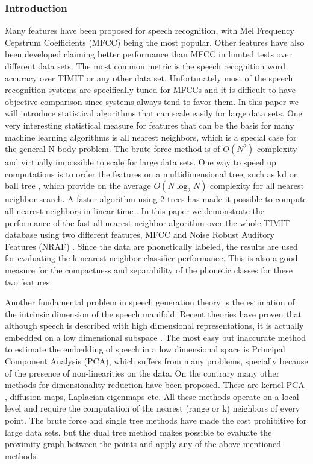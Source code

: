 \documentclass[12pt,letterpaper,doublespaced,ETD,dvips,proposal]{gtthesis}
\begin{document}
\begin{Body}
\subsubsection{Introduction}
Many features have been proposed for speech recognition, with Mel
Frequency Cepstrum Coefficients (MFCC) \cite{quatieri2002dts} being
the most popular. Other features have also been developed claiming
better performance than MFCC in limited tests over different data
sets. The most common metric is the speech recognition word accuracy
over TIMIT or any other data set. Unfortunately most of the speech
recognition systems are specifically tuned for MFCCs and it is
difficult to have objective comparison since systems always tend to
favor them. In this paper we will introduce statistical algorithms
that can scale easily for large data sets. One very interesting
statistical measure for features that can be the basis for many
machine learning algorithms is all nearest neighbors, which is a
special case for the general N-body problem. The brute force method
is of $O(N^2)$  complexity and virtually impossible to scale for
large data sets. One way to speed up computations is to order the
features on a multidimensional tree, such as kd or ball tree
\cite{bentley1975bst}, \cite{moore2000ahu} which provide on the
average $O(N\log_2N)$ complexity for all nearest neighbor search. A
faster algorithm using 2 trees has made it possible to compute all
nearest neighbors in linear time \cite{gray2000nbp}.  In this paper
we demonstrate the performance of the fast all nearest neighbor
algorithm over the whole TIMIT database using two different
features, MFCC and Noise Robust Auditory Features (NRAF)
\cite{ravindran:inr}. Since the data are phonetically labeled, the
results are used for evaluating the k-nearest neighbor classifier
performance. This is also a good measure for the compactness and
separability of the phonetic classes for these two features.

Another fundamental problem in speech generation theory is the
estimation of the intrinsic dimension of the speech manifold. Recent
theories have proven that although speech is described with high
dimensional representations, it is actually embedded on a low
dimensional subspace \cite{jansen2006ifa}. The most easy but
inaccurate method to estimate the embedding of speech in a low
dimensional space is Principal Component Analysis (PCA), which
suffers from many problems, specially because of the presence of
non-linearities on the data. On the contrary many other methods for
dimensionality reduction have been proposed. These are kernel PCA
\cite{scholkopf:nca}, diffusion maps, Laplacian eigenmaps
\cite{coifman2006dm} etc. All these methods operate on a local level
and require the computation of the nearest (range or k) neighbors of
every point. The brute force and single tree methods have made the
cost prohibitive for large data sets, but the dual tree method makes
possible to evaluate the proximity graph between the points and
apply any of the above mentioned methods.


\end{Body}
\end{document}
